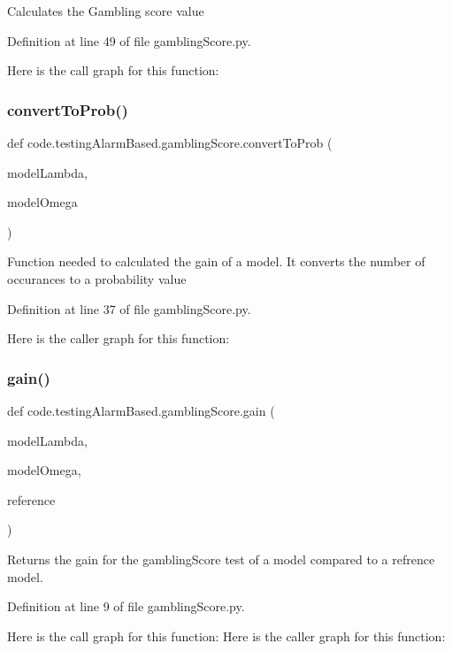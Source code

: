 \begin{DoxyVerb}Calculates the Gambling score value
\end{DoxyVerb}
 

Definition at line 49 of file gambling\+Score.\+py.

Here is the call graph for this function\+:
\mbox{\label{namespacecode_1_1testing_alarm_based_1_1gambling_score_ae086faa2b17afdc98db596679f232d20}} 
\subsubsection{\texorpdfstring{convert\+To\+Prob()}{convertToProb()}}
{\footnotesize\ttfamily def code.\+testing\+Alarm\+Based.\+gambling\+Score.\+convert\+To\+Prob (\begin{DoxyParamCaption}\item[{}]{model\+Lambda,  }\item[{}]{model\+Omega }\end{DoxyParamCaption})}

\begin{DoxyVerb}Function needed to calculated the gain of a model.
It converts the number of occurances to a probability value
\end{DoxyVerb}
 

Definition at line 37 of file gambling\+Score.\+py.

Here is the caller graph for this function\+:
\mbox{\label{namespacecode_1_1testing_alarm_based_1_1gambling_score_a1b976a411bf64f4dd4e11bda62fdb183}} 
\subsubsection{\texorpdfstring{gain()}{gain()}}
{\footnotesize\ttfamily def code.\+testing\+Alarm\+Based.\+gambling\+Score.\+gain (\begin{DoxyParamCaption}\item[{}]{model\+Lambda,  }\item[{}]{model\+Omega,  }\item[{}]{reference }\end{DoxyParamCaption})}

\begin{DoxyVerb}Returns the gain for the gamblingScore test of a model compared to a refrence model.
\end{DoxyVerb}
 

Definition at line 9 of file gambling\+Score.\+py.

Here is the call graph for this function\+:
Here is the caller graph for this function\+:
